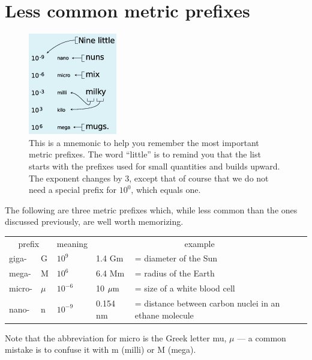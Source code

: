 \section{Less common metric prefixes}\label{sec:exotic-prefixes}


\begin{figure}
\begin{center}
\includegraphics{./introduction/figs/metric-mnemonic}
\caption{      This is a mnemonic to help you remember the most important metric
      prefixes. The word ``little'' is to remind you that the list starts with the prefixes used for
      small quantities and builds upward. The exponent changes by 3, except that of course that we
      do not need a special prefix for $10^0$, which equals one.}
\end{center}
\end{figure}

\vspace{1.5mm}
The following are three metric prefixes which, while less
common than the ones discussed previously, are well worth memorizing.
\begin{center}
\noindent\begin{tabular}{llllp{48mm}}
    \multicolumn{2}{c}{prefix} & meaning & \multicolumn{2}{c}{example} \\
   giga-   &  G      &$10^9$     & 1.4 Gm             &=  diameter of the Sun  \\
    mega-   &  M      &$10^6$     & 6.4 Mm             &=  radius of the Earth  \\
    micro-  &  $\mu$  &$10^{-6}$  & 10 $\mu\textup{m}$     &=  size of a white blood cell  \\
    nano-   &   n     &$10^{-9}$  & 0.154 nm           &=  distance between carbon nuclei in an ethane molecule
\end{tabular}
\end{center}

Note that the abbreviation for micro is the Greek letter mu,
$\mu$ --- a common mistake is to confuse it with m
(milli) or M (mega).


